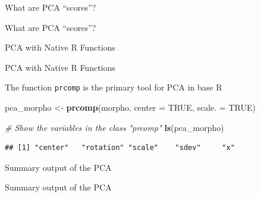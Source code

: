 \documentclass[ignorenonframetext,]{beamer}
\newenvironment{Shaded}{\begin{snugshade}}{\end{snugshade}}
\newcommand{\CommentTok}[1]{\textcolor[rgb]{0.56,0.35,0.01}{\textit{#1}}}
\newcommand{\DataTypeTok}[1]{\textcolor[rgb]{0.13,0.29,0.53}{#1}}
\newcommand{\DecValTok}[1]{\textcolor[rgb]{0.00,0.00,0.81}{#1}}
\newcommand{\KeywordTok}[1]{\textcolor[rgb]{0.13,0.29,0.53}{\textbf{#1}}}
\newcommand{\NormalTok}[1]{#1}
\newcommand{\OperatorTok}[1]{\textcolor[rgb]{0.81,0.36,0.00}{\textbf{#1}}}
\newcommand{\OtherTok}[1]{\textcolor[rgb]{0.56,0.35,0.01}{#1}}
\newcommand{\StringTok}[1]{\textcolor[rgb]{0.31,0.60,0.02}{#1}}
\begin{document}
\begin{frame}[fragile]{What are PCA ``scores''?}
\begin{block}{What are PCA ``scores''?}
\end{block}

\end{frame}

\begin{frame}[fragile]{PCA with Native R Functions}
\protect\hypertarget{pca-with-native-r-functions}{}

\begin{block}{PCA with Native R Functions}

The function \texttt{prcomp} is the primary tool for PCA in base R

\begin{Shaded}
\begin{Highlighting}[]
\NormalTok{pca_morpho <-}\StringTok{ }\KeywordTok{prcomp}\NormalTok{(morpho, }\DataTypeTok{center =} \OtherTok{TRUE}\NormalTok{, }\DataTypeTok{scale. =} \OtherTok{TRUE}\NormalTok{)}

\CommentTok{# Show the variables in the class "prcomp"}
\KeywordTok{ls}\NormalTok{(pca_morpho)}
\end{Highlighting}
\end{Shaded}

\begin{verbatim}
## [1] "center"   "rotation" "scale"    "sdev"     "x"
\end{verbatim}

\end{block}

\begin{block}{Summary output of the PCA}

\begin{Shaded}
\end{Shaded}

\end{block}

\begin{block}{Summary output of the PCA}

\begin{table}[H]
\centering\begingroup\fontsize{35}{37}\selectfont


\end{table}
\end{block}
\end{frame}
\end{document}
